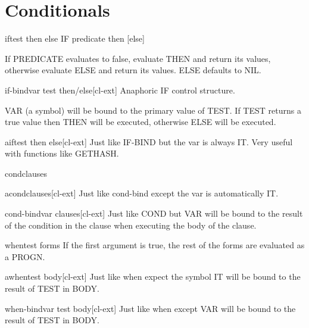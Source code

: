 \documentclass[10pt,english]{book}
\begin{document}
\section{Conditionals}
\label{sec:conditionals}

\begin{specialop}{if}{test then \op else}
  IF predicate then [else]

If PREDICATE evaluates to false, evaluate THEN and return its values,
otherwise evaluate ELSE and return its values. ELSE defaults to NIL.
\end{specialop}

\begin{macro}{if-bind}{var test \body then/else}[cl-ext]
  Anaphoric IF control structure.

VAR (a symbol) will be bound to the primary value of TEST. If
TEST returns a true value then THEN will be executed, otherwise
ELSE will be executed.
\end{macro}

\begin{macro}{aif}{test then \op else}[cl-ext]
  Just like IF-BIND but the var is always IT. Very useful with
  functions like GETHASH.
\end{macro}

\begin{macro}{cond}{\rest clauses}
  
\end{macro}

\begin{macro}{acond}{\rest clauses}[cl-ext]
  Just like cond-bind except the var is automatically IT.
\end{macro}

\begin{macro}{cond-bind}{var \body clauses}[cl-ext]
  Just like COND but VAR will be bound to the result of the
  condition in the clause when executing the body of the clause.
\end{macro}

\begin{macro}{when}{test \body forms}
  If the first argument is true, the rest of the forms are
evaluated as a PROGN.
\end{macro}

\begin{macro}{awhen}{test \body body}[cl-ext]
  Just like when expect the symbol IT will be
  bound to the result of TEST in BODY.
\end{macro}

\begin{macro}{when-bind}{var test \body body}[cl-ext]
  Just like when except VAR will be bound to the
  result of TEST in BODY.
\end{macro}
\end{document}
